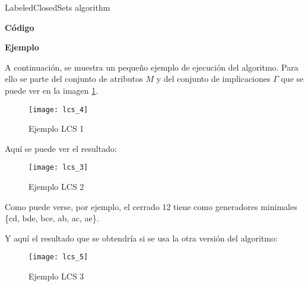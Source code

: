 \IncMargin{1em}
\begin{algorithm}[H]
    \SetAlgoLined
    \DontPrintSemicolon
    \caption{LabeledClosedSets algorithm}\label{alg:3}
\end{algorithm}\DecMargin{1em}
\newpage

\textbf{C\'odigo} 

\textbf{Ejemplo} 

A continuaci\'on, se muestra un peque\~no ejemplo de ejecuci\'on del algoritmo. Para ello se parte del conjunto de atributos \(M\) y del conjunto de implicaciones \(\Gamma\) que se puede ver en la imagen \ref{fig:lcs_4}.
\begin{figure}[H]
    \centering
    \texttt{[image: lcs\_4]}
    \caption{Ejemplo LCS 1}
    \label{fig:lcs_4}
\end{figure} 
\newpage
Aqu\'i se puede ver el resultado:
\begin{figure}[H]
    \centering
    \texttt{[image: lcs\_3]}
    \caption{Ejemplo LCS 2}
    \label{fig:lcs_3}
\end{figure}

Como puede verse, por ejemplo, el cerrado 12 tiene como generadores minimales \{cd, bde, bce, ab, ac, ae\}.

Y aqu\'i el resultado que se obtendr\'ia si se usa la otra versi\'on del algoritmo:
\begin{figure}[H]
    \centering
    \texttt{[image: lcs\_5]}
    \caption{Ejemplo LCS 3}
    \label{fig:lcs_5}
\end{figure}
\newpage
